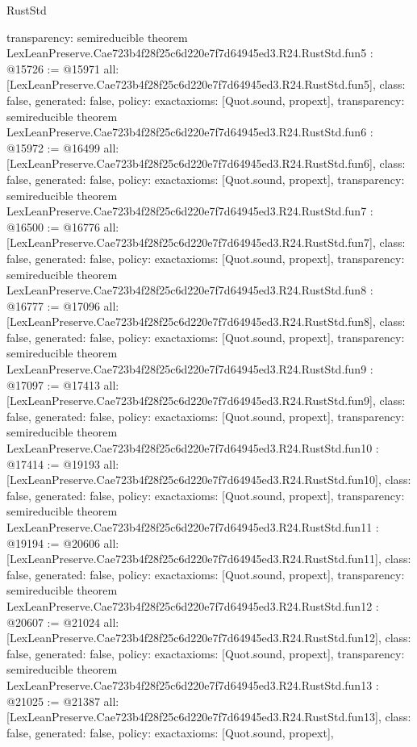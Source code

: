 \begin{lexlean}{RustStd}
\begin{coremodule}
{  transparency: semireducible
}
theorem LexLeanPreserve.Cae723b4f28f25c6d220e7f7d64945ed3.R24.RustStd.fun5 : @15726 := @15971 {
  all: [LexLeanPreserve.Cae723b4f28f25c6d220e7f7d64945ed3.R24.RustStd.fun5],
  class: false,
  generated: false,
  policy: exact{axioms: [Quot.sound, propext]},
  transparency: semireducible
}
theorem LexLeanPreserve.Cae723b4f28f25c6d220e7f7d64945ed3.R24.RustStd.fun6 : @15972 := @16499 {
  all: [LexLeanPreserve.Cae723b4f28f25c6d220e7f7d64945ed3.R24.RustStd.fun6],
  class: false,
  generated: false,
  policy: exact{axioms: [Quot.sound, propext]},
  transparency: semireducible
}
theorem LexLeanPreserve.Cae723b4f28f25c6d220e7f7d64945ed3.R24.RustStd.fun7 : @16500 := @16776 {
  all: [LexLeanPreserve.Cae723b4f28f25c6d220e7f7d64945ed3.R24.RustStd.fun7],
  class: false,
  generated: false,
  policy: exact{axioms: [Quot.sound, propext]},
  transparency: semireducible
}
theorem LexLeanPreserve.Cae723b4f28f25c6d220e7f7d64945ed3.R24.RustStd.fun8 : @16777 := @17096 {
  all: [LexLeanPreserve.Cae723b4f28f25c6d220e7f7d64945ed3.R24.RustStd.fun8],
  class: false,
  generated: false,
  policy: exact{axioms: [Quot.sound, propext]},
  transparency: semireducible
}
theorem LexLeanPreserve.Cae723b4f28f25c6d220e7f7d64945ed3.R24.RustStd.fun9 : @17097 := @17413 {
  all: [LexLeanPreserve.Cae723b4f28f25c6d220e7f7d64945ed3.R24.RustStd.fun9],
  class: false,
  generated: false,
  policy: exact{axioms: [Quot.sound, propext]},
  transparency: semireducible
}
theorem LexLeanPreserve.Cae723b4f28f25c6d220e7f7d64945ed3.R24.RustStd.fun10 : @17414 := @19193 {
  all: [LexLeanPreserve.Cae723b4f28f25c6d220e7f7d64945ed3.R24.RustStd.fun10],
  class: false,
  generated: false,
  policy: exact{axioms: [Quot.sound, propext]},
  transparency: semireducible
}
theorem LexLeanPreserve.Cae723b4f28f25c6d220e7f7d64945ed3.R24.RustStd.fun11 : @19194 := @20606 {
  all: [LexLeanPreserve.Cae723b4f28f25c6d220e7f7d64945ed3.R24.RustStd.fun11],
  class: false,
  generated: false,
  policy: exact{axioms: [Quot.sound, propext]},
  transparency: semireducible
}
theorem LexLeanPreserve.Cae723b4f28f25c6d220e7f7d64945ed3.R24.RustStd.fun12 : @20607 := @21024 {
  all: [LexLeanPreserve.Cae723b4f28f25c6d220e7f7d64945ed3.R24.RustStd.fun12],
  class: false,
  generated: false,
  policy: exact{axioms: [Quot.sound, propext]},
  transparency: semireducible
}
theorem LexLeanPreserve.Cae723b4f28f25c6d220e7f7d64945ed3.R24.RustStd.fun13 : @21025 := @21387 {
  all: [LexLeanPreserve.Cae723b4f28f25c6d220e7f7d64945ed3.R24.RustStd.fun13],
  class: false,
  generated: false,
  policy: exact{axioms: [Quot.sound, propext]},
}
\end{coremodule}
\end{lexlean}
